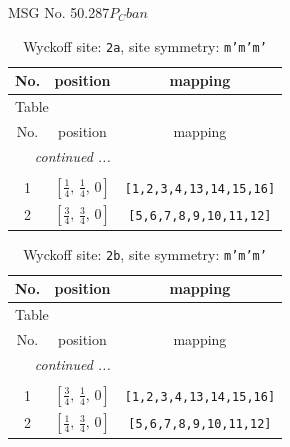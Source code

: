 \documentclass[fleqn,8pt]{jsarticle}
\begin{document}
\setcounter{MaxMatrixCols}{32}

\renewcommand{\tablename}{Table~}
\renewcommand{\figurename}{Figure~}
\begin{center}
\LARGE
MSG No. 50.287\quad$P_{C}ban$
\end{center}
\renewcommand{\arraystretch}{1.2}
\begin{longtable}{ccc}
\caption{Wyckoff site: {\tt 2a}, site symmetry: {\tt m'm'm'}}
 \\
 \hline \hline
No. & position & mapping \\ \hline \endfirsthead

\multicolumn{2}{l}{\tablename\ \thetable{}} \\
 \hline \hline
No. & position & mapping \\ \hline \endhead

 \hline \hline
\multicolumn{2}{r}{\footnotesize\it continued ...} \\ \endfoot

 \hline \hline
\multicolumn{2}{r}{} \\ \endlastfoot

1 & $\left[ \frac{1}{4},\, \frac{1}{4},\, 0 \right]$ & {\tt [1,2,3,4,13,14,15,16]} \\ \hline
2 & $\left[ \frac{3}{4},\, \frac{3}{4},\, 0 \right]$ & {\tt [5,6,7,8,9,10,11,12]} \\
\end{longtable}
\renewcommand{\arraystretch}{1.2}
\begin{longtable}{ccc}
\caption{Wyckoff site: {\tt 2b}, site symmetry: {\tt m'm'm'}}
 \\
 \hline \hline
No. & position & mapping \\ \hline \endfirsthead

\multicolumn{2}{l}{\tablename\ \thetable{}} \\
 \hline \hline
No. & position & mapping \\ \hline \endhead

 \hline \hline
\multicolumn{2}{r}{\footnotesize\it continued ...} \\ \endfoot

 \hline \hline
\multicolumn{2}{r}{} \\ \endlastfoot

1 & $\left[ \frac{3}{4},\, \frac{1}{4},\, 0 \right]$ & {\tt [1,2,3,4,13,14,15,16]} \\ \hline
2 & $\left[ \frac{1}{4},\, \frac{3}{4},\, 0 \right]$ & {\tt [5,6,7,8,9,10,11,12]} \\
\end{longtable}
\end{document}
